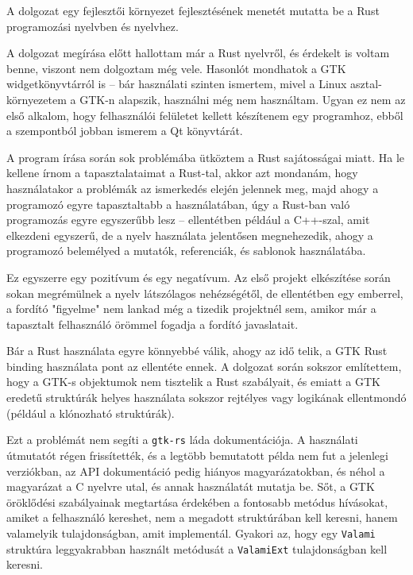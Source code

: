 

A dolgozat egy fejlesztői környezet fejlesztésének menetét mutatta be a Rust programozási nyelvben és nyelvhez.

A dolgozat megírása előtt hallottam már a Rust nyelvről, és érdekelt is voltam benne, 
viszont nem dolgoztam még vele.
Hasonlót mondhatok a GTK widgetkönyvtárról is -- bár használati szinten ismertem, 
mivel a Linux asztal-környezetem a GTK-n alapszik, használni még nem használtam.
Ugyan ez nem az első alkalom, hogy felhasználói felületet kellett készítenem egy programhoz,
ebből a szempontból jobban ismerem a Qt könyvtárát.

A program írása során sok problémába ütköztem a Rust sajátosságai miatt.
Ha le kellene írnom a tapasztalataimat a Rust-tal, akkor azt mondanám, hogy használatakor
a problémák az ismerkedés elején jelennek meg, majd ahogy a programozó egyre tapasztaltabb
a használatában, úgy a Rust-ban való programozás egyre egyszerűbb lesz --
ellentétben például a C++-szal, amit elkezdeni egyszerű, de a nyelv használata jelentősen megnehezedik,
ahogy a programozó belemélyed a mutatók, referenciák, és sablonok használatába.

Ez egyszerre egy pozitívum és egy negatívum.
Az első projekt elkészítése során sokan megrémülnek a nyelv látszólagos nehézségétől,
de ellentétben egy emberrel, a fordító "figyelme" nem lankad még a tizedik projektnél sem,
amikor már a tapasztalt felhasználó örömmel fogadja a fordító javaslatait.

Bár a Rust használata egyre könnyebbé válik, ahogy az idő telik, a GTK Rust binding használata pont az ellentéte ennek.
A dolgozat során sokszor említettem, hogy a GTK-s objektumok nem tisztelik a Rust szabályait,
és emiatt a GTK eredetű struktúrák helyes használata sokszor rejtélyes vagy logikának ellentmondó
(például a klónozható struktúrák).

Ezt a problémát nem segíti a \texttt{gtk-rs} láda dokumentációja.
A használati útmutatót régen frissítették, és a legtöbb bemutatott példa nem fut a jelenlegi verziókban,
az API dokumentáció pedig hiányos magyarázatokban, és néhol a magyarázat a C nyelvre utal, és annak használatát mutatja be.
Sőt, a GTK öröklődési szabályainak megtartása érdekében a fontosabb metódus hívásokat, amiket a felhasználó kereshet,
nem a megadott struktúrában kell keresni, hanem valamelyik tulajdonságban, amit implementál.
Gyakori az, hogy egy \texttt{Valami} struktúra 
leggyakrabban használt metódusát a \texttt{ValamiExt} tulajdonságban kell keresni.

